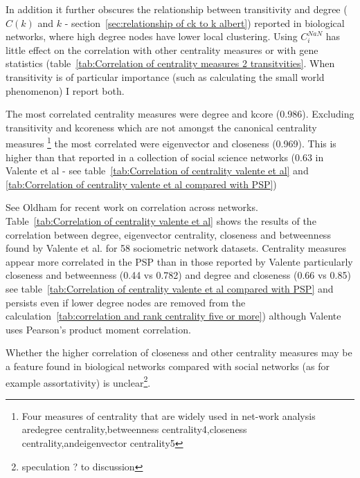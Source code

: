 In addition it further obscures the relationship between transitivity and degree ( $C(k)$ and $k$ - section~\ref{sec:relationship of ck to k albert}) reported in biological networks, where high degree nodes have lower local clustering\cite{albert2005scale}. Using $C_i^{NaN}$ has little effect on the correlation with other centrality measures or with gene statistics (table~\ref{tab:Correlation of centrality measures 2 transitvities}. When transitivity is of particular importance (such as calculating the small world phenomenon) I report both.


The most correlated centrality measures were degree and kcore (0.986). Excluding transitivity and kcoreness which are not amongst the canonical centrality measures \cite{okamoto2008ranking}\footnote{Four measures of centrality that are widely used in net-work analysis aredegree centrality,betweenness centrality4,closeness centrality,andeigenvector centrality5} the most correlated were eigenvector and closeness (0.969). This is higher than that reported in a collection of social science networks (0.63 in Valente et al\cite{valente2008correlated} - see table~\ref{tab:Correlation of centrality valente et al} and \ref{tab:Correlation of centrality valente et al compared with PSP}) 

See Oldham\cite{oldham2019consistency} for recent work on correlation across networks. Table~\ref{tab:Correlation of centrality valente et al} shows the results of the correlation between degree, eigenvector centrality, closeness and betweenness found by Valente et al.\cite{valente2008correlated} for 58 sociometric network datasets. Centrality measures appear more correlated in the PSP than in those reported by Valente particularly closeness and betweenness (0.44 vs 0.782) and degree and closeness (0.66 vs 0.85) see table~\ref{tab:Correlation of centrality valente et al compared with PSP} and persists even if lower degree nodes are removed from the calculation~\ref{tab:correlation and rank centrality five or more}) although Valente\cite{valente2008correlated} uses Pearson's product moment correlation.

Whether the higher correlation of closeness and other centrality measures may be a feature found in biological networks compared with social networks (as for example assortativity) is unclear\footnote{speculation ? to discussion}. 

